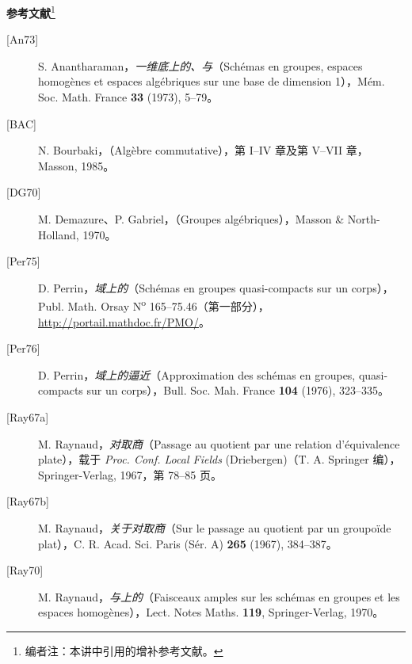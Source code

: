 \textbf{参考文献}\footnote{编者注：本讲中引用的增补参考文献。}
\begin{description}
\item[{[An73]}] S. Anantharaman，\emph{一维底上的、与}（Schémas en groupes, espaces homogènes et espaces algébriques sur une base de dimension 1），Mém. Soc. Math. France \textbf{33} (1973), 5--79。
\item[{[BAC]}] N. Bourbaki，\emph{}（Algèbre commutative），第 I--IV 章及第 V--VII 章，Masson, 1985。
\item[{[DG70]}] M. Demazure、P. Gabriel，\emph{}（Groupes algébriques），Masson \& North-Holland, 1970。
\item[{[Per75]}] D. Perrin，\emph{域上的}（Schémas en groupes quasi-compacts sur un corps），Publ. Math. Orsay N\textsuperscript{o} 165--75.46（第一部分），\url{http://portail.mathdoc.fr/PMO/}。
\item[{[Per76]}] D. Perrin，\emph{域上的逼近}（Approximation des schémas en groupes, quasi-compacts sur un corps），Bull. Soc. Mah. France \textbf{104} (1976), 323--335。
\item[{[Ray67a]}] M. Raynaud，\emph{对取商}（Passage au quotient par une relation d'équivalence plate），载于 \emph{Proc. Conf. Local Fields} (Driebergen)（T. A. Springer 编），Springer-Verlag, 1967，第 78--85 页。
\item[{[Ray67b]}] M. Raynaud，\emph{关于对取商}（Sur le passage au quotient par un groupoïde plat），C. R. Acad. Sci. Paris (Sér. A) \textbf{265} (1967), 384--387。
\item[{[Ray70]}] M. Raynaud，\emph{与上的}（Faisceaux amples sur les schémas en groupes et les espaces homogènes），Lect. Notes Maths. \textbf{119}, Springer-Verlag, 1970。
\end{description}
